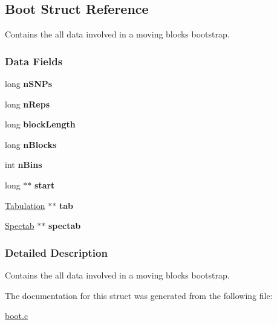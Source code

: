 \hypertarget{struct_boot}{\subsection{\-Boot \-Struct \-Reference}
\label{struct_boot}
}


\-Contains the all data involved in a moving blocks bootstrap.  


\subsubsection*{\-Data \-Fields}
\begin{DoxyCompactItemize}
\item 
\hypertarget{struct_boot_a18e0000190ca60f9dc4eb761d906f522}{long {\bfseries n\-S\-N\-Ps}}\label{struct_boot_a18e0000190ca60f9dc4eb761d906f522}

\item 
\hypertarget{struct_boot_a3ddfe1f35a0d954a3c3d4e7bb6bd3d7b}{long {\bfseries n\-Reps}}\label{struct_boot_a3ddfe1f35a0d954a3c3d4e7bb6bd3d7b}

\item 
\hypertarget{struct_boot_a13df8ad3415e414295d50d8d431448fd}{long {\bfseries block\-Length}}\label{struct_boot_a13df8ad3415e414295d50d8d431448fd}

\item 
\hypertarget{struct_boot_ad19f1bd44e5c69b3e2929d9cd4acee6f}{long {\bfseries n\-Blocks}}\label{struct_boot_ad19f1bd44e5c69b3e2929d9cd4acee6f}

\item 
\hypertarget{struct_boot_acb414ada586db3fdda3de3d550f7be19}{int {\bfseries n\-Bins}}\label{struct_boot_acb414ada586db3fdda3de3d550f7be19}

\item 
\hypertarget{struct_boot_ac54bba1f1c56ac4d6f19b9dbcd39e9d0}{long $\ast$$\ast$ {\bfseries start}}\label{struct_boot_ac54bba1f1c56ac4d6f19b9dbcd39e9d0}

\item 
\hypertarget{struct_boot_a4646dc5f1bd2fb61e7e951011ce895c0}{\hyperlink{struct_tabulation}{\-Tabulation} $\ast$$\ast$ {\bfseries tab}}\label{struct_boot_a4646dc5f1bd2fb61e7e951011ce895c0}

\item 
\hypertarget{struct_boot_a679ad99ec613dc3c429fac568d7c8953}{\hyperlink{struct_spectab}{\-Spectab} $\ast$$\ast$ {\bfseries spectab}}\label{struct_boot_a679ad99ec613dc3c429fac568d7c8953}

\end{DoxyCompactItemize}


\subsubsection{\-Detailed \-Description}
\-Contains the all data involved in a moving blocks bootstrap. 

\-The documentation for this struct was generated from the following file\-:\begin{DoxyCompactItemize}
\item 
\hyperlink{boot_8c}{boot.\-c}\end{DoxyCompactItemize}
